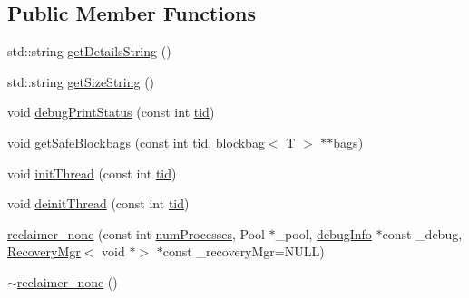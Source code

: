 \subsection*{Public Member Functions}
\begin{DoxyCompactItemize}
\item 
std\+::string \hyperlink{classreclaimer__none_ab3504e7df5f9c56384a81ab042ef64dd}{get\+Details\+String} ()
\item 
std\+::string \hyperlink{classreclaimer__none_aea6c1a61f5891ca3f542f900165d0246}{get\+Size\+String} ()
\item 
void \hyperlink{classreclaimer__none_ae70908a43f8772e5294c5f5ceae0716c}{debug\+Print\+Status} (const int \hyperlink{microbench_2main_8cpp_a9ca9869868fe7e7a38a921cc7de4103f}{tid})
\item 
void \hyperlink{classreclaimer__none_a8d073432aa881a89b9729f63f47b74ec}{get\+Safe\+Blockbags} (const int \hyperlink{microbench_2main_8cpp_a9ca9869868fe7e7a38a921cc7de4103f}{tid}, \hyperlink{classblockbag}{blockbag}$<$ T $>$ $\ast$$\ast$bags)
\item 
void \hyperlink{classreclaimer__none_a16e9b3199168e6715744f108382e083c}{init\+Thread} (const int \hyperlink{microbench_2main_8cpp_a9ca9869868fe7e7a38a921cc7de4103f}{tid})
\item 
void \hyperlink{classreclaimer__none_adf9a32c7d612d8929cd19908845757cf}{deinit\+Thread} (const int \hyperlink{microbench_2main_8cpp_a9ca9869868fe7e7a38a921cc7de4103f}{tid})
\item 
\hyperlink{classreclaimer__none_a05c1dab65707686e75d2263c4e4a8a9b}{reclaimer\+\_\+none} (const int \hyperlink{testing_8cpp_aa085812188e21ede75351d88b9b2c30d}{num\+Processes}, Pool $\ast$\+\_\+pool, \hyperlink{classdebugInfo}{debug\+Info} $\ast$const \+\_\+debug, \hyperlink{classRecoveryMgr}{Recovery\+Mgr}$<$ void $\ast$$>$ $\ast$const \+\_\+recovery\+Mgr=N\+U\+LL)
\item 
\hyperlink{classreclaimer__none_a7015c1c9dd0a1151e59c06b8cada74a9}{$\sim$reclaimer\+\_\+none} ()
\end{DoxyCompactItemize}
